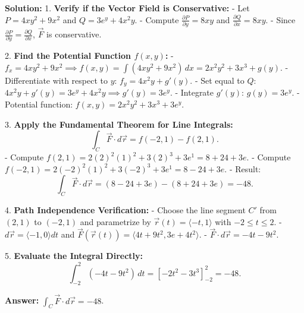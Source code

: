 \documentclass[9pt]{article}
\begin{document}
\begin{multicols}{2}
\begin{tcolorbox}[title=\textbf{Example: Evaluating a Line Integral}, colframe=lightpink]
    \textbf{Solution:}
    1. \textbf{Verify if the Vector Field is Conservative:}
       - Let \( P = 4xy^2 + 9x^2 \) and \( Q = 3e^y + 4x^2 y \).
       - Compute \( \frac{\partial P}{\partial y} = 8xy \) and \( \frac{\partial Q}{\partial x} = 8xy \).
       - Since \( \frac{\partial P}{\partial y} = \frac{\partial Q}{\partial x} \), \( \vec{F} \) is conservative.
    
    2. \textbf{Find the Potential Function \( f(x, y) \):}
       - \( f_x = 4xy^2 + 9x^2 \implies f(x, y) = \int (4xy^2 + 9x^2) \, dx = 2x^2 y^2 + 3x^3 + g(y) \).
       - Differentiate with respect to \( y \): \( f_y = 4x^2 y + g'(y) \).
       - Set equal to \( Q \): \( 4x^2 y + g'(y) = 3e^y + 4x^2 y \implies g'(y) = 3e^y \).
       - Integrate \( g'(y) \): \( g(y) = 3e^y \).
       - Potential function: \( f(x, y) = 2x^2 y^2 + 3x^3 + 3e^y \).
    
    3. \textbf{Apply the Fundamental Theorem for Line Integrals:}
       \[ \int_C \vec{F} \cdot d\vec{r} = f(-2, 1) - f(2, 1). \]
       - Compute \( f(2, 1) = 2(2)^2(1)^2 + 3(2)^3 + 3e^1 = 8 + 24 + 3e \).
       - Compute \( f(-2, 1) = 2(-2)^2(1)^2 + 3(-2)^3 + 3e^1 = 8 - 24 + 3e \).
       - Result: \[ \int_C \vec{F} \cdot d\vec{r} = (8 - 24 + 3e) - (8 + 24 + 3e) = -48. \]
    
    4. \textbf{Path Independence Verification:}
       - Choose the line segment \( C' \) from \( (2, 1) \) to \( (-2, 1) \) and parametrize by \( \vec{r}(t) = \langle -t, 1 \rangle \) with \( -2 \leq t \leq 2 \).
       - \( d\vec{r} = \langle -1, 0 \rangle dt \) and \( \vec{F}(\vec{r}(t)) = \langle 4t + 9t^2, 3e + 4t^2 \rangle \).
       - \( \vec{F} \cdot d\vec{r} = -4t - 9t^2 \).
    
    5. \textbf{Evaluate the Integral Directly:}
       \[ \int_{-2}^{2} (-4t - 9t^2) \, dt = \left[ -2t^2 - 3t^3 \right]_{-2}^{2} = -48. \]
    
    \textbf{Answer:} \( \int_C \vec{F} \cdot d\vec{r} = -48 \).
\end{tcolorbox}

\end{multicols}
\end{document}
